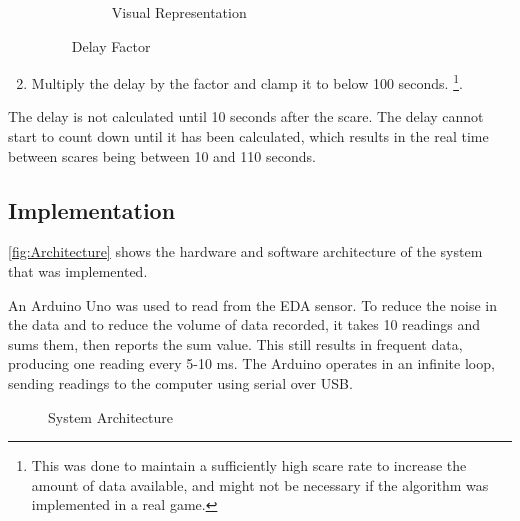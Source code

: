 \documentclass[12pt,a4paper]{article}\usepackage[]{graphicx}\usepackage[]{color}
\begin{document}
\begin{enumerate}
\begin{figure}[H]
\begin{subfigure}[t]{.45\linewidth}
\begin{minipage}{\textwidth}
{}



  	\end{minipage}
  	\caption{Visual Representation}
  \end{subfigure}
  \caption{Delay Factor}
  \label{fig:DelayFactor}
\end{figure}
	
	\item Multiply the delay by the factor and clamp it to below 100 seconds.
	\footnote{
		This was done to maintain a sufficiently high scare rate to increase the amount of data available, and might not be necessary if the algorithm was implemented in a real game.
	}.
\end{enumerate}

The delay is not calculated until 10 seconds after the scare.
The delay cannot start to count down until it has been calculated, which results in the real time between scares being between 10 and 110 seconds.

\subsection{Implementation}

\vref{fig:Architecture} shows the hardware and software architecture of the system that was implemented.

An Arduino Uno was used to read from the EDA sensor.
To reduce the noise in the data and to reduce the volume of data recorded, it takes 10 readings and sums them, then reports the sum value.
This still results in frequent data, producing one reading every 5-10 ms.
The Arduino operates in an infinite loop, sending readings to the computer using serial over USB.

\begin{figure}[htb]
	\centering
	\caption{System Architecture}
	\label{fig:Architecture}
\end{figure}
\end{document}
